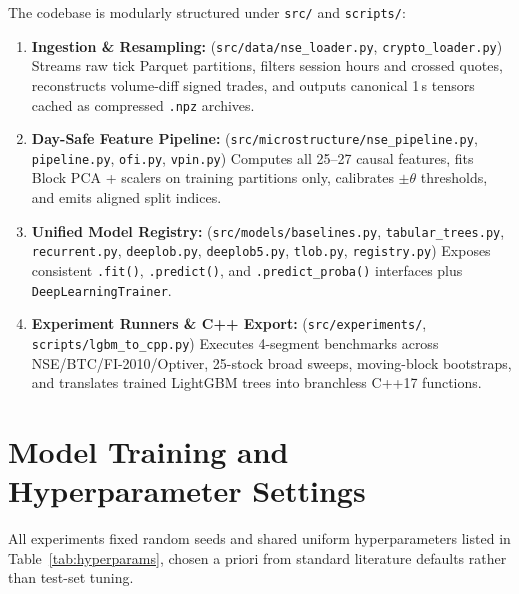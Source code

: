 \documentclass[12pt,a4paper,oneside]{report}
\newcommand{\code}[1]{\texttt{#1}}
\begin{document}
The codebase is modularly structured under \code{src/} and \code{scripts/}:
\begin{enumerate}
  \item \textbf{Ingestion \& Resampling:} (\code{src/data/nse\_loader.py}, \code{crypto\_loader.py}) Streams raw tick Parquet partitions, filters session hours and crossed quotes, reconstructs volume-diff signed trades, and outputs canonical 1\,s tensors cached as compressed \code{.npz} archives.
  \item \textbf{Day-Safe Feature Pipeline:} (\code{src/microstructure/nse\_pipeline.py}, \code{pipeline.py}, \code{ofi.py}, \code{vpin.py}) Computes all 25--27 causal features, fits Block PCA + scalers on training partitions only, calibrates $\pm\theta$ thresholds, and emits aligned split indices.
  \item \textbf{Unified Model Registry:} (\code{src/models/baselines.py}, \code{tabular\_trees.py}, \code{recurrent.py}, \code{deeplob.py}, \code{deeplob5.py}, \code{tlob.py}, \code{registry.py}) Exposes consistent \code{.fit()}, \code{.predict()}, and \code{.predict\_proba()} interfaces plus \code{DeepLearningTrainer}.
  \item \textbf{Experiment Runners \& C++ Export:} (\code{src/experiments/}, \code{scripts/lgbm\_to\_cpp.py}) Executes 4-segment benchmarks across NSE/BTC/FI-2010/Optiver, 25-stock broad sweeps, moving-block bootstraps, and translates trained LightGBM trees into branchless C++17 functions.
\end{enumerate}

\section{Model Training and Hyperparameter Settings}

All experiments fixed random seeds and shared uniform hyperparameters listed in Table~\ref{tab:hyperparams}, chosen a priori from standard literature defaults rather than test-set tuning.
\end{document}
